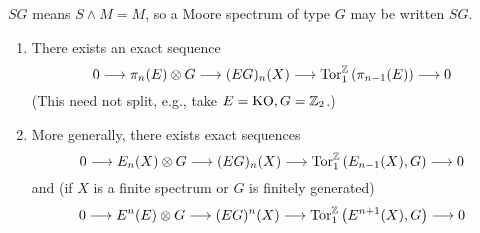 \documentclass[../main]{subfiles}
\begin{document}
\begin{example}
$SG$ means $S\wedge M = M$, so a Moore spectrum of type $G$ may be written $SG$.
\end{example}

\begin{proposition}\label{prop:p3c06.6}
\begin{enumerate}
    \item There exists an exact sequence
    \[0\longrightarrow \pi_n(E)\otimes G \longrightarrow (EG)_n(X)\longrightarrow \mathrm{Tor}_1^{\mathbb{Z}} \left(\pi_{n-1}(E)\right) \longrightarrow 0\]
    (This need not split, e.g., take $E=\mathrm{KO}, G=\mathbb{Z}_2$.)
    \item More generally, there exists exact sequences
    \[0\longrightarrow E_n(X)\otimes G \longrightarrow (EG)_n(X)\longrightarrow \mathrm{Tor}_1^{\mathbb{Z}} \left(E_{n-1}(X), G\right) \longrightarrow 0\]
    and (if $X$ is a finite spectrum or $G$ is finitely generated)
    \[0\longrightarrow E^n(E)\otimes G \longrightarrow (EG)^n(X)\longrightarrow \mathrm{Tor}_1^{\mathbb{Z}} \left(E^{n+1}(X), G\right) \longrightarrow 0\]
\end{enumerate}
\end{proposition}
\end{document}
